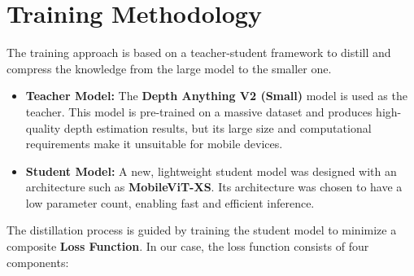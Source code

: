 \section{Training Methodology}
\label{sec:training_methodology}

The training approach is based on a teacher-student framework to distill and compress the knowledge from the large model to the smaller one.

\begin{itemize}
    \item \textbf{Teacher Model:} The \textbf{Depth Anything V2 (Small)} model is used as the teacher. This model is pre-trained on a massive dataset and produces high-quality depth estimation results, but its large size and computational requirements make it unsuitable for mobile devices.
    \item \textbf{Student Model:} A new, lightweight student model was designed with an architecture such as \textbf{MobileViT-XS}. Its architecture was chosen to have a low parameter count, enabling fast and efficient inference.
\end{itemize}

The distillation process is guided by training the student model to minimize a composite \textbf{Loss Function}. In our case, the loss function consists of four components:

